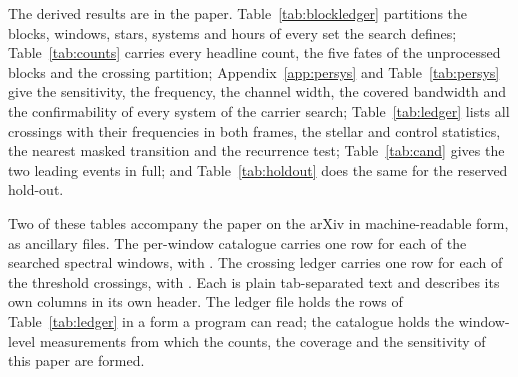 The derived results are in the paper. Table~\ref{tab:blockledger} partitions
the blocks, windows, stars, systems and hours of every set the search defines;
Table~\ref{tab:counts} carries every headline count, the five fates of the
unprocessed blocks and the crossing partition; Appendix~\ref{app:persys} and
Table~\ref{tab:persys} give the sensitivity, the frequency, the channel
width, the covered bandwidth and the confirmability of every system of the
carrier search;
Table~\ref{tab:ledger} lists all \EvNCrossRaw{}
crossings with their frequencies in both frames, the stellar and control
statistics, the nearest masked transition and the recurrence test;
Table~\ref{tab:cand} gives the two leading events in full; and
Table~\ref{tab:holdout} does the same for the reserved hold-out.

Two of these tables accompany the paper on the arXiv in machine-readable form,
as ancillary files. The per-window catalogue carries one row for each of the
\NWindows{} searched spectral windows, with \SiCatColList. The crossing ledger
carries one row for each of the \EvNCrossRaw{} threshold crossings, with
\SiLdgColList. Each is plain tab-separated text and describes its own columns
in its own header. The ledger file holds the rows of
Table~\ref{tab:ledger} in a form a program can read; the catalogue holds the window-level measurements from which the counts,
the coverage and the sensitivity of this paper are formed.

